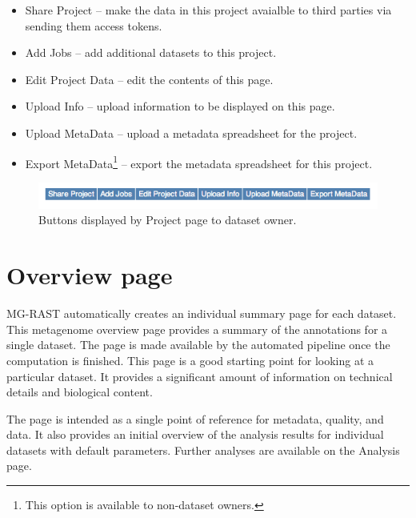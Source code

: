 \documentclass[12pt,fullpage]{report}
\begin{document}
\begin{itemize}
\item Share Project --
make the data in this project avaialble to third parties via sending them access tokens.

\item Add Jobs --
add additional datasets to this project.

\item Edit Project Data --
edit the contents of this page.

\item Upload Info --
upload information to be displayed on this page.

\item Upload MetaData --
upload a metadata spreadsheet for the project.

\item Export MetaData\footnote{This option is available to non-dataset owners.} --
export the metadata spreadsheet for this project.

\end{itemize}

\begin{figure}
\begin{center}
\includegraphics[width=6in]{Images/project-page-editing-buttons.png}
\end{center}
\caption{
Buttons displayed by Project page to
dataset owner.}
\label{fig:project-page-editing-buttons}
\end{figure}

\section{Overview page}

MG-RAST automatically creates an individual summary page for each dataset. This metagenome overview page provides a summary of the annotations for a single dataset. The page is made available by the automated pipeline once the computation is finished.
This page is a good starting point for looking at a particular dataset. It provides a significant amount of information on technical details and biological content.

The page is intended as a single point of reference for metadata, quality, and data. It also provides an initial overview of the analysis results for individual datasets with default parameters. Further analyses are available on the Analysis page.
\end{document}
